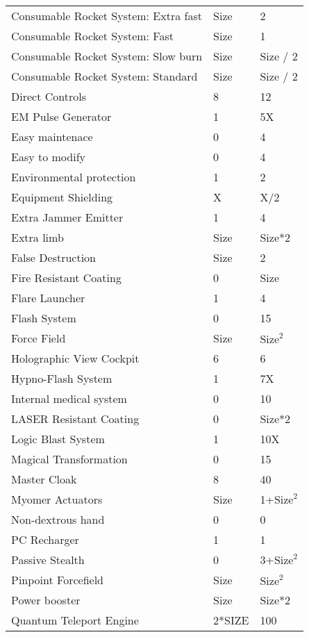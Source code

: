 \documentclass[twoside]{book}
\begin{document}
\begin{longtable}{p{1.25in}ll}
      \raggedright Consumable Rocket System: Extra
           fast & Size & 2 \tabularnewline
      \raggedright Consumable Rocket System: Fast
           & Size & 1 \tabularnewline
      \raggedright Consumable Rocket System: Slow
           burn & Size & Size / 2 \tabularnewline
      \raggedright Consumable Rocket System:
           Standard & Size & Size / 2 \tabularnewline
      \raggedright Direct Controls & 8 & 12 \tabularnewline
      \raggedright EM Pulse Generator & 1 & 5X \tabularnewline
      \raggedright Easy maintenace & 0 & 4 \tabularnewline
      \raggedright Easy to modify & 0 & 4 \tabularnewline
      \raggedright Environmental protection
           & 1 & 2 \tabularnewline
      \raggedright Equipment Shielding & X & X/2 \tabularnewline
      \raggedright Extra Jammer Emitter & 1 & 4 \tabularnewline
      \raggedright Extra limb & Size & Size*2 \tabularnewline
      \raggedright False Destruction & Size & 2 \tabularnewline
      \raggedright Fire Resistant Coating & 0 & Size \tabularnewline
      \raggedright Flare Launcher & 1 & 4 \tabularnewline
      \raggedright Flash System & 0 & 15 \tabularnewline
      \raggedright Force Field & Size & \begin{math}{\textrm{Size}}^{2}\end{math} \tabularnewline
      \raggedright Holographic View Cockpit
           & 6 & 6 \tabularnewline
      \raggedright Hypno-Flash System & 1 & 7X \tabularnewline
      \raggedright Internal medical system
           & 0 & 10 \tabularnewline
      \raggedright LASER Resistant Coating
           & 0 & Size*2 \tabularnewline
      \raggedright Logic Blast System & 1 & 10X \tabularnewline
      \raggedright Magical Transformation & 0 & 15 \tabularnewline
      \raggedright Master Cloak & 8 & 40 \tabularnewline
      \raggedright Myomer Actuators & Size & 1+\begin{math}{\textrm{Size}}^{2}\end{math} \tabularnewline
      \raggedright Non-dextrous hand & 0 & 0 \tabularnewline
      \raggedright PC Recharger & 1 & 1 \tabularnewline
      \raggedright Passive Stealth & 0 & 3+\begin{math}{\textrm{Size}}^{2}\end{math} \tabularnewline
      \raggedright Pinpoint Forcefield & Size & \begin{math}{\textrm{Size}}^{2}\end{math} \tabularnewline
      \raggedright Power booster & Size & Size*2 \tabularnewline
      \raggedright Quantum Teleport Engine
           & 2*SIZE & 100 \tabularnewline

\end{longtable}
\end{document}
